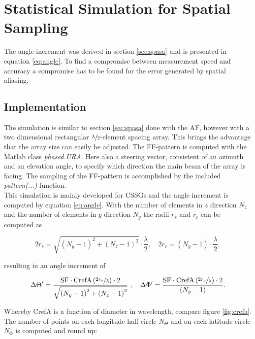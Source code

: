 \chapter{Statistical Simulation for Spatial Sampling}

The angle increment was derived in section \ref{sec:spasa} and is presented in equation \ref{eq:angle}. To find a compromise between measurement speed and accuracy a compromise has to be found for the error generated by spatial aliasing. 

\section{Implementation}

The simulation is similar to section \ref{sec:spasa} done with the \ac{AF}, however with a two dimensional rectangular $\sfrac{\lambda}{2}$-element spacing array. This brings the advantage that the array size can easily be adjusted. The \ac{FF}-pattern is computed with the Matlab\texttrademark{} class \textit{phased.URA}. Here also a steering vector, consistent of an azimuth and an elevation angle, to specify which direction the main beam of the array is facing. The sampling of the \ac{FF}-pattern is accomplished by the included \textit{pattern(...)} function.\\
This simulation is mainly developed for \acp{CSSG} and the angle increment is computed by equation \ref{eq:angle}. With the number of elements in $z$ direction $N_z$ and the number of elements in $y$ direction $N_y$ the radii $r_s$ and $r_c$ can be computed as

\begin{equation}
2r_s = \sqrt{\left(N_y-1\right)^2+\left(N_z-1\right)^2}\cdot\frac{\lambda}{2},\quad 2r_c=\left(N_y-1\right)\cdot\frac{\lambda}{2},
\end{equation}

resulting in an angle increment of

\begin{equation}
\Delta\Theta^\prime = \frac{\text{SF}\cdot\text{CrefA}\left(\sfrac{2r_s}{\lambda}\right)\cdot 2}{\sqrt{\left(N_y-1\right)^2+\left(N_z-1\right)^2}}\ ,\quad\Delta\Phi^\prime = \frac{\text{SF}\cdot\text{CrefA}\left(\sfrac{2r_c}{\lambda}\right)\cdot 2}{\left(N_y-1\right)}.
\end{equation}

Whereby \ac{CrefA} is a function of diameter in wavelength, compare figure \ref{fig:crefa}. The number of points on each longitude half circle $N_\Theta$ and on each latitude circle $N_\Phi$ is computed and round up:

